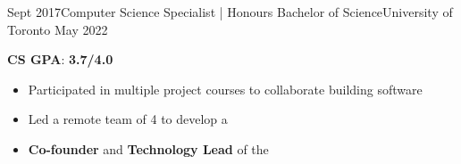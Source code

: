 %
%
%


\begin{experiences}
  \university
    {Sept 2017}{Computer Science Specialist | Honours Bachelor of Science}{University of Toronto}
    {May 2022} {
                      \textbf{CS GPA}: \textbf{3.7/4.0}
                      \begin{itemize}
                        \setlength\itemsep{0.2em}
                        \item Participated in multiple project courses to collaborate building software
                        \item Led a remote team of 4 to develop a 
                        \item \textbf{Co-founder} and \textbf{Technology Lead} of the 
                      \end{itemize}
                    }
\end{experiences}
